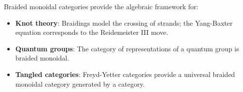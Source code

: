 Braided monoidal categories provide the algebraic framework for:
\begin{itemize}
\item \textbf{Knot theory}: Braidings model the crossing of strands; the Yang-Baxter equation corresponds to the Reidemeister III move.
\item \textbf{Quantum groups}: The category of representations of a quantum group is braided monoidal.
\item \textbf{Tangled categories}: Freyd-Yetter categories provide a universal braided monoidal category generated by a category.
\end{itemize}